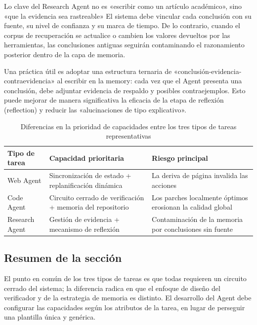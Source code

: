 \documentclass[a4paper]{article}
\begin{document}
\begin{importantbox}{Lo clave del Research Agent no es «escribir como un artículo académico», sino «que la evidencia sea rastreable»}
El sistema debe vincular cada conclusión con su fuente, su nivel de confianza y su marca de tiempo. De lo contrario, cuando el corpus de recuperación se actualice o cambien los valores devueltos por las herramientas, las conclusiones antiguas seguirán contaminando el razonamiento posterior dentro de la capa de memoria.
\end{importantbox}

Una práctica útil es adoptar una estructura ternaria de «conclusión-evidencia-contraevidencia» al escribir en la memory: cada vez que el Agent presenta una conclusión, debe adjuntar evidencia de respaldo y posibles contraejemplos. Esto puede mejorar de manera significativa la eficacia de la etapa de reflexión (reflection) y reducir las «alucinaciones de tipo explicativo».

\begin{table}[H]
\centering
\begin{tabular}{p{2.7cm}p{3.9cm}p{4.4cm}}
\toprule
\textbf{Tipo de tarea} & \textbf{Capacidad prioritaria} & \textbf{Riesgo principal} \\
\midrule
Web Agent & Sincronización de estado + replanificación dinámica & La deriva de página invalida las acciones \\
Code Agent & Circuito cerrado de verificación + memoria del repositorio & Los parches localmente óptimos erosionan la calidad global \\
Research Agent & Gestión de evidencia + mecanismo de reflexión & Contaminación de la memoria por conclusiones sin fuente \\
\bottomrule
\end{tabular}
\caption{Diferencias en la prioridad de capacidades entre los tres tipos de tareas representativas}
\end{table}

\subsection{Resumen de la sección}
El punto en común de los tres tipos de tareas es que todas requieren un circuito cerrado del sistema; la diferencia radica en que el enfoque de diseño del verificador y de la estrategia de memoria es distinto. El desarrollo del Agent debe configurar las capacidades según los atributos de la tarea, en lugar de perseguir una plantilla única y genérica.
\end{document}
